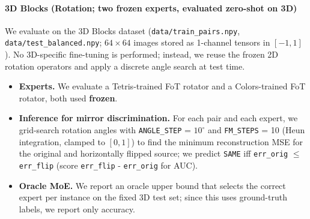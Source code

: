 \documentclass{l4proj}
\begin{document}
\paragraph{3D Blocks (Rotation; two frozen experts, evaluated zero-shot on 3D)}
We evaluate on the 3D Blocks dataset (\texttt{data/train\_pairs.npy}, \texttt{data/test\_balanced.npy}; $64{\times}64$ images stored as 1-channel tensors in $[-1,1]$). No 3D-specific fine-tuning is performed; instead, we reuse the frozen 2D rotation operators and apply a discrete angle search at test time.
\begin{itemize}
    \item \textbf{Experts.} We evaluate a Tetris-trained FoT rotator and a Colors-trained FoT rotator, both used \textbf{frozen}.
    \item \textbf{Inference for mirror discrimination.} For each pair and each expert, we grid-search rotation angles with \texttt{ANGLE\_STEP} = $10^\circ$ and \texttt{FM\_STEPS} = 10 (Heun integration, clamped to $[0,1]$) to find the minimum reconstruction MSE for the original and horizontally flipped source; we predict \texttt{SAME} iff \texttt{err\_orig} $\le$ \texttt{err\_flip} (score \texttt{err\_flip} - \texttt{err\_orig} for AUC).
    \item \textbf{Oracle MoE.} We report an oracle upper bound that selects the correct expert per instance on the fixed 3D test set; since this uses ground-truth labels, we report only accuracy.
\end{itemize}
\end{document}
